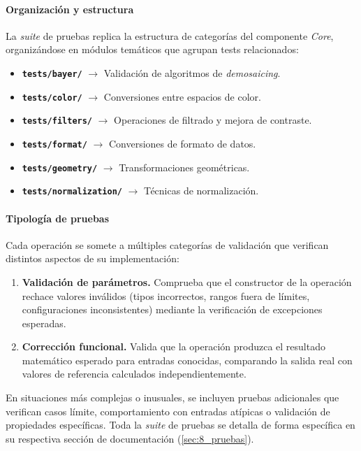 \paragraph{Organización y estructura} \label{par:7_3_7_1_organizacion_estructura_tests}
La \textit{suite} de pruebas replica la estructura de categorías del componente \textit{Core}, organizándose
en módulos temáticos que agrupan tests relacionados:

\begin{itemize}[noitemsep]
    \item \texttt{\textbf{tests/bayer/}} $\rightarrow$ Validación de algoritmos de \textit{demosaicing}.
    \item \texttt{\textbf{tests/color/}} $\rightarrow$ Conversiones entre espacios de color.
    \item \texttt{\textbf{tests/filters/}} $\rightarrow$ Operaciones de filtrado y mejora de contraste.
    \item \texttt{\textbf{tests/format/}} $\rightarrow$ Conversiones de formato de datos.
    \item \texttt{\textbf{tests/geometry/}} $\rightarrow$ Transformaciones geométricas.
    \item \texttt{\textbf{tests/normalization/}} $\rightarrow$ Técnicas de normalización.
\end{itemize}

\paragraph{Tipología de pruebas} \label{par:7_3_7_3_tipologia_pruebas}
Cada operación se somete a múltiples categorías de validación que verifican distintos aspectos
de su implementación:

\begin{enumerate}[noitemsep]
    \item \textbf{Validación de parámetros.} Comprueba que el constructor de la operación rechace
    valores inválidos (tipos incorrectos, rangos fuera de límites, configuraciones inconsistentes)
    mediante la verificación de excepciones esperadas.
    \item \textbf{Corrección funcional.} Valida que la operación produzca el resultado matemático
    esperado para entradas conocidas, comparando la salida real con valores de referencia calculados
    independientemente.
\end{enumerate}

En situaciones más complejas o inusuales, se incluyen pruebas adicionales que verifican casos límite, 
comportamiento con entradas atípicas o validación de propiedades específicas. Toda la \textit{suite} de pruebas 
se detalla de forma específica en su respectiva sección de documentación (\autoref{sec:8_pruebas}).

